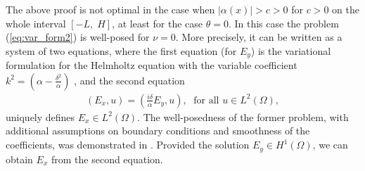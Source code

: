 \begin{remark}
\end{remark}
\begin{remark} 
\label{remark:other}
The above proof is not optimal in the case when $\left|\alpha(x)\right|>c>0$ for $c>0$ on the whole interval $[-L,\; H]$, at least 
for the case $\theta=0$. In this case the problem (\ref{eq:var_form2}) is well-posed for $\nu=0$. More precisely, it can be written 
as a system of two equations, where the first equation (for $E_y$) is the variational formulation for the Helmholtz equation 
with the variable coefficient $k^2=(\alpha-\frac{\delta^2}{\alpha})$ , and the second equation 
\begin{align*}
  \left(E_x,u\right)=\left(\frac{i\delta}{\alpha}E_y,u\right),\; \text{ for all } u\in L^{2}(\Omega), 
\end{align*}
uniquely defines $E_x\in L^{2}(\Omega)$. The well-posedness of the former problem, with additional assumptions on boundary conditions and smoothness of the coefficients, 
was demonstrated in \cite{LMIG_thesis}. Provided the solution $E_y\in H^{1}(\Omega)$, we can obtain $E_x$ from the second equation.
\end{remark}





